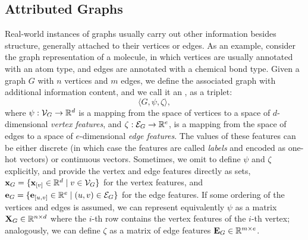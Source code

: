 \subsection{Attributed Graphs} \label{sec:attr-graphs}
Real-world instances of graphs usually carry out other information besides structure, generally attached to their vertices or edges. As an example, consider the graph representation of a molecule, in which vertices are usually annotated with an atom type, and edges are annotated with a chemical bond type. Given a graph $G$ with $n$ vertices and $m$ edges, we define the associated graph with additional information content, and we call it an , as a triplet:
$$\langle G, \psi, \zeta \rangle,$$
where $\psi: \Cal{V}_G \rightarrow \Real^d$ is a mapping from the space of vertices to a space of $d$-dimensional \emph{vertex features}, and $\zeta: \Cal{E}_G \rightarrow \Real^{e}$, is a mapping from the space of edges to a space of $e$-dimensional \emph{edge features}. The values of these features can be either discrete (in which case the features are called \emph{labels} and encoded as one-hot vectors) or continuous vectors. Sometimes, we omit to define $\psi$ and $\zeta$ explicitly, and provide the vertex and edge features directly as sets, \eg $\Vector{x}_G = \Set{\Elem{x}{v} \in \Real^d \mid v \in \Cal{V}_G}$ for the vertex features, and $\Vector{e}_G = \Set{\Elem{e}{u,v} \in \Real^e \mid (u, v) \in \Cal{E}_G}$ for the edge features.
If some ordering of the vertices and edges is assumed, we can represent equivalently $\psi$ as a matrix $\Matrix{x}_G \in \Real^{n \times d}$ where the $i$-th row contains the vertex features of the $i$-th vertex; analogously, we can define $\zeta$ as a matrix of edge features $\Matrix{E}_G \in \Real^{m \times e}$.

